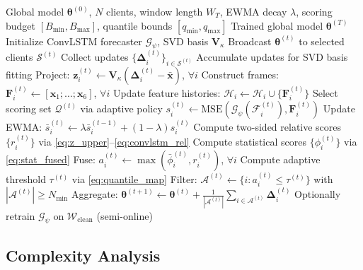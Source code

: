 \begin{algorithm}[t]
\caption{ST-ConvLSTM-EWMA Byzantine-Resilient Federated Aggregation}\label{alg:framework}
\begin{algorithmic}[1]
\REQUIRE Global model $\boldsymbol{\theta}^{(0)}$, $N$ clients, window length $W_T$, EWMA decay $\lambda$, scoring budget $[B_{\min}, B_{\max}]$, quantile bounds $[q_{\min}, q_{\max}]$
\ENSURE Trained global model $\boldsymbol{\theta}^{(T)}$
\STATE Initialize ConvLSTM forecaster $\mathcal{G}_\psi$, SVD basis $\mathbf{V}_\kappa$
    \STATE Broadcast $\boldsymbol{\theta}^{(t)}$ to selected clients $\mathcal{S}^{(t)}$
    \STATE Collect updates $\{\boldsymbol{\Delta}_i^{(t)}\}_{i \in \mathcal{S}^{(t)}}$
        \STATE Accumulate updates for SVD basis fitting
    \ENDIF
    \STATE Project: $\mathbf{z}_i^{(t)} \leftarrow \mathbf{V}_\kappa(\boldsymbol{\Delta}_i^{(t)} - \bar{\mathbf{x}})$, $\forall i$
    \STATE Construct frames: $\mathbf{F}_i^{(t)} \leftarrow [\mathbf{x}_1; \ldots; \mathbf{x}_6]$, $\forall i$
    \STATE Update feature histories: $\mathcal{H}_i \leftarrow \mathcal{H}_i \cup \{\mathbf{F}_i^{(t)}\}$
    \STATE Select scoring set $\mathcal{Q}^{(t)}$ via adaptive policy
        \STATE $s_i^{(t)} \leftarrow \text{MSE}(\mathcal{G}_\psi(\mathcal{F}_i^{(t)}), \mathbf{F}_i^{(t)})$
        \STATE Update EWMA: $\bar{s}_i^{(t)} \leftarrow \lambda \bar{s}_i^{(t-1)} + (1-\lambda) s_i^{(t)}$
    \ENDFOR
    \STATE Compute two-sided relative scores $\{r_i^{(t)}\}$ via \eqref{eq:z_upper}--\eqref{eq:convlstm_rel}
    \STATE Compute statistical scores $\{\phi_i^{(t)}\}$ via \eqref{eq:stat_fused}
    \STATE Fuse: $a_i^{(t)} \leftarrow \max(\bar{\phi}_i^{(t)}, r_i^{(t)})$, $\forall i$
    \STATE Compute adaptive threshold $\tau^{(t)}$ via \eqref{eq:quantile_map}
    \STATE Filter: $\mathcal{A}^{(t)} \leftarrow \{i : a_i^{(t)} \leq \tau^{(t)}\}$ with $|\mathcal{A}^{(t)}| \geq N_{\min}$
    \STATE Aggregate: $\boldsymbol{\theta}^{(t+1)} \leftarrow \boldsymbol{\theta}^{(t)} + \frac{1}{|\mathcal{A}^{(t)}|} \sum_{i \in \mathcal{A}^{(t)}} \boldsymbol{\Delta}_i^{(t)}$
    \STATE Optionally retrain $\mathcal{G}_\psi$ on $\mathcal{W}_{\text{clean}}$ (semi-online)
\ENDFOR
\end{algorithmic}
\end{algorithm}

\subsection{Complexity Analysis}\label{subsec:complexity}

